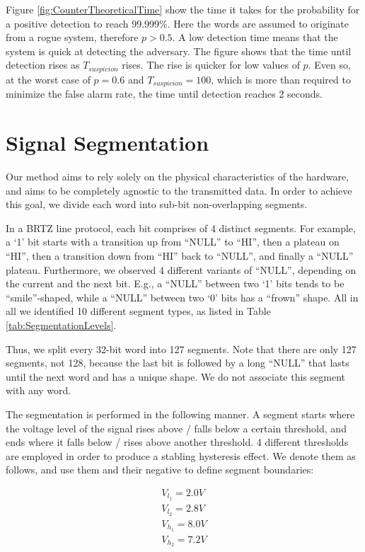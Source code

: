\documentclass[compsoc,conference,a4paper]{IEEEtran}
\newcommand{\level}[1]{\section{#1}}
\newcommand{\level}[1]{\chapter{#1}}
\begin{document}
  Figure \ref{fig:CounterTheoreticalTime} show the time it takes for the probability for a positive detection to reach 99.999\%. Here the words are assumed to originate from a rogue system, therefore $p > 0.5$. A low detection time means that the system is quick at detecting the adversary. The figure shows that the time until detection rises as $T_{suspicion}$ rises. The rise is quicker for low values of $p$. Even so, at the worst case of $p = 0.6$ and $T_{suspicion} = 100$, which is more than required to minimize the false alarm rate, the time until detection reaches 2 seconds.
   
\level{Signal Segmentation} \label{SignalSegmentation}
  Our method aims to rely solely on the physical characteristics of the hardware, and aims to be completely agnostic to the transmitted data. In order to achieve this goal, we divide each word into sub-bit non-overlapping segments.
  
  In a BRTZ line protocol, each bit comprises of 4 distinct segments. For example, a `1' bit starts with a transition up from ``NULL'' to ``HI'', then a plateau on ``HI'', then a transition down from ``HI'' back to ``NULL'', and finally a ``NULL'' plateau. Furthermore, we observed 4 different variants of ``NULL'', depending on the current and the next bit. E.g., a ``NULL'' between two `1' bits tends to be ``smile''-shaped, while a ``NULL'' between two `0' bits has a ``frown'' shape. All in all we identified 10 different segment types, as listed in Table \ref{tab:SegmentationLevels}.
  
  Thus, we split every 32-bit word into 127 segments. Note that there are only 127 segments, not 128, because the last bit is followed by a long ``NULL'' that lasts until the next word and has a unique shape. We do not associate this segment with any word.
  
  The segmentation is performed in the following manner. A segment starts where the voltage level of the signal rises above / falls below a certain threshold, and ends where it falls below / rises above another threshold. 4 different thresholds are employed in order to produce a stabling hysteresis effect. We denote them as follows, and use them and their negative to define segment boundaries:
  
  \begin{align*}
    V_{l_1} = 2.0V \\
    V_{l_2} = 2.8V \\
    V_{h_1} = 8.0V \\
    V_{h_2} = 7.2V 
  \end{align*}
  
\end{document}

